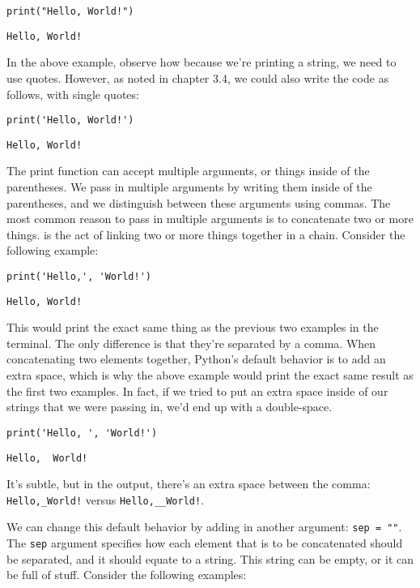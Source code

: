 \begin{lstlisting}[style=pippython]
print("Hello, World!")
\end{lstlisting}
\begin{lstlisting}
Hello, World!
\end{lstlisting}
In the above example, observe how because we're printing a string, we need to use quotes. However, as noted in chapter 3.4, we could also write the code as follows, with single quotes:
\begin{lstlisting}[style=pippython]
print('Hello, World!')
\end{lstlisting}
\begin{lstlisting}
Hello, World!
\end{lstlisting}
The print function can accept multiple arguments, or things inside of the parentheses. We pass in multiple arguments by writing them inside of the parentheses, and we distinguish between these arguments using commas. The most common reason to pass in multiple arguments is to concatenate two or more things.  is the act of linking two or more things together in a chain. Consider the following example:
\begin{lstlisting}[style=pippython]
print('Hello,', 'World!')
\end{lstlisting}
\begin{lstlisting}
Hello, World!
\end{lstlisting}
This would print the exact same thing as the previous two examples in the terminal. The only difference is that they're separated by a comma. When concatenating two elements together, Python's default behavior is to add an extra space, which is why the above example would print the exact same result as the first two examples. In fact, if we tried to put an extra space inside of our strings that we were passing in, we'd end up with a double-space.
\begin{lstlisting}[style=pippython]
print('Hello, ', 'World!')
\end{lstlisting}
\begin{lstlisting}
Hello,  World!
\end{lstlisting}
It's subtle, but in the output, there's an extra space between the comma: \verb|Hello,_World!| versus \verb|Hello,__World!|.\par
We can change this default behavior by adding in another argument: \verb|sep = ""|. The \verb|sep| argument specifies how each element that is to be concatenated should be separated, and it should equate to a string. This string can be empty, or it can be full of stuff. Consider the following examples:
